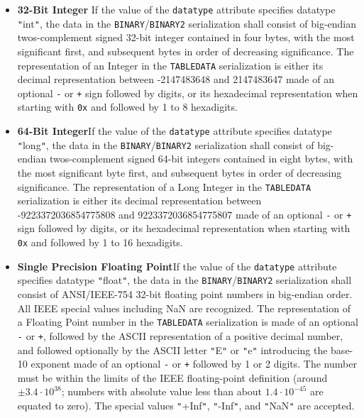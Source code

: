 \documentclass[11pt,a4paper]{ivoa}
\let\fg=\color
\def\attr#1{{\tt{\fg{DarkRed}#1}}}
\def\elem#1{{\tt{\fg{DarkRed}#1}}}
\def\literalvalue#1{{\tt"}{{\fg{DarkPurple}#1}}{\tt"}}
\begin{document}
\begin{itemize}
\item {\bf 32-Bit Integer }\quad If the value of the {\attr{datatype}}
attribute specifies datatype {\literalvalue{int}},
the data in the \elem{BINARY}/\elem{BINARY2} serialization shall consist of
big-endian twos-complement signed 32-bit
integer contained in four bytes, with the most significant first,
and subsequent bytes in order of decreasing significance.
The representation of an Integer in the \elem{TABLEDATA} serialization
is either its decimal representation between -2147483648 and 2147483647
made of an optional {\tt-} or {\tt+} sign followed by digits,
or its hexadecimal representation when starting with {\tt0x}
and followed by 1 to 8 hexadigits.

\item {\bf 64-Bit Integer}\quad If the value of the {\attr{datatype}}
attribute specifies datatype {\literalvalue{long}},
the data in the \elem{BINARY}/\elem{BINARY2} serialization shall consist of
big-endian twos-complement signed 64-bit integers
contained in eight bytes, with the most significant byte first,
and subsequent bytes in order of decreasing significance.
The representation of a Long Integer in the \elem{TABLEDATA} serialization
is either its decimal representation between -9223372036854775808
and 9223372036854775807
made of an optional {\tt-} or {\tt+} sign followed by digits,
or its hexadecimal representation when starting with {\tt0x}
and followed by 1 to 16 hexadigits.

\item {\bf Single Precision Floating Point}\quad If
the value of the {\attr{datatype}} attribute specifies datatype {\literalvalue{float}},
the data in the \elem{BINARY}/\elem{BINARY2} serialization shall consist of
ANSI/IEEE-754 32-bit floating point numbers in big-endian order.
All IEEE special values including NaN are recognized.
The representation of a Floating Point number in the
\elem{TABLEDATA} serialization is made of an optional {\tt-} or {\tt+},
followed by the ASCII representation of a positive decimal number,
and followed optionally by the ASCII letter \literalvalue{E} or  \literalvalue{e}
introducing the base-10 exponent made of an optional {\tt-} or {\tt+}
followed by 1 or 2 digits. The number must be within the limits of the
IEEE floating-point definition (around $\pm3.4\cdot10^{38}$; numbers with
absolute value less than about $1.4\cdot10^{-45}$ are equated to zero).
The special
values \literalvalue{+Inf}, \literalvalue{-Inf}, and \literalvalue{NaN} are accepted.



\end{itemize}
\end{document}
